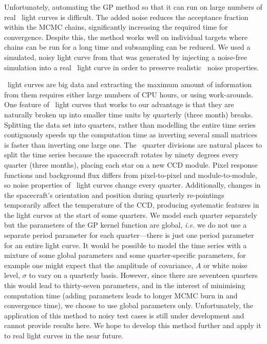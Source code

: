 Unfortunately, automating the GP method so that it can run on large numbers of
real \kepler\ light curves is difficult.
The added noise reduces the acceptance fraction within the MCMC chains,
significantly increasing the required time for convergence.
Despite this, the method works well on individual targets where chains can be
run for a long time and subsampling can be reduced.
We used a simulated, noisy light curve from \citet{Aigrain2015} that was
generated by injecting a noise-free simulation into a real \kepler\ light
curve in order to preserve realistic \kepler\ noise properties.

\kepler\ light curves are big data and extracting the maximum amount of
information from them requires either large numbers of CPU hours, or using
work-arounds.
One feature of \kepler\ light curves that works to our advantage is that they
are naturally broken up into smaller time units by quarterly (three month)
breaks.
Splitting the data set into quarters, rather than modelling the entire time
series contiguously speeds up the computation time as inverting several
small matrices is faster than inverting one large one.
The \kepler\ quarter divisions are natural places to split the time series
because the spacecraft rotates by ninety degrees every quarter (three months),
placing each star on a new CCD module.
Pixel response functions and background flux differs from pixel-to-pixel and
module-to-module, so noise properties of \kepler\ light curves change every
quarter.
Additionally, changes in the spacecraft's orientation and position during
quarterly re-pointings temporarily affect the temperature of the CCD,
producing systematic features in the light curves at the start of some
quarters.
We model each quarter separately but the parameters of the GP kernel function
are global, {\it i.e.} we do not use a separate period parameter for each
quarter---there is just one period parameter for an entire light curve.
It would be possible to model the time series with a mixture of some global
parameters and some quarter-specific parameters, for example one might expect
that the amplitude of covariance, $A$ or white noise level, $\sigma$ to vary
on a quarterly basis.
However, since there are seventeen quarters this would lead to thirty-seven
parameters, and in the interest of minimising computation time (adding
parameters leads to longer MCMC burn in and convergence time), we choose to
use global parameters only.
Unfortunately, the application of this method to noisy test cases is still
under development and cannot provide results here.
We hope to develop this method further and apply it to real light curves in
the near future.

